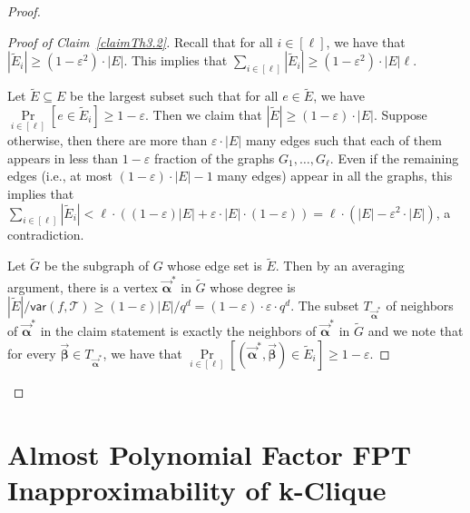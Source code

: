 \documentclass[11pt]{article}
\renewcommand{\ge}{ \geqslant}
\newcommand{\alphab}{\vec{\bm{\alpha}}}
\newcommand{\betab}{\vec{\bm{\beta}}}
\newcommand{\var}{\mathsf{var}}
\renewcommand{\tilde}{\widetilde}
\begin{document}
\begin{proof}
	 \begin{proof}[Proof of Claim~\ref{claimTh3.2}] Recall that for all $i\in [\ell]$, we have that 
		$|\tilde E_i|\ge (1-\varepsilon^2)\cdot |E|$. This implies that $\sum_{i\in [\ell]}|\tilde E_i|\ge (1-\varepsilon^2)\cdot |E|\ell$.
		
		Let $\tilde E\subseteq E$ be the largest subset such that for all $e\in \tilde E$, we have $\underset{i\in [\ell]}{\Pr}[e\in \tilde E_i]\ge 1-\varepsilon$.  Then we claim that $|\tilde E|\ge (1-\varepsilon)\cdot |E|$. Suppose otherwise, then there are more than $\varepsilon\cdot |E|$ many edges  such that each of them appears in less than $1-\varepsilon$ fraction of the graphs $G_1,\ldots ,G_{\ell}$. Even if the remaining edges (i.e., at most $(1-\varepsilon)\cdot |E|-1$ many edges) appear in all the graphs, this implies that $\sum_{i\in [\ell]}|\tilde E_i|< \ell\cdot( (1-\varepsilon)|E| + \varepsilon\cdot |E|\cdot (1-\varepsilon)) = \ell\cdot \left(|E| -\varepsilon^{2}\cdot |E|\right)$, a contradiction. 
		
		Let $\tilde G$ be the subgraph of $G$ whose edge set is $\tilde E$. Then by an averaging argument, there is a vertex $\alphab^*$ in $\tilde G$ whose  degree is $|\tilde E|/\var(f,\mathcal{T})\ge (1-\varepsilon)|E|/q^d= (1-\varepsilon)\cdot \varepsilon\cdot q^d$. The subset $T_{\alphab^*}$ of neighbors of $\alphab^*$ in the claim statement is exactly the neighbors of $\alphab^*$ in $\tilde{G}$ and we note that for every $\betab\in T_{\alphab^*}$, we have that  $\underset{i\in [\ell]}{\Pr}[(\alphab^*,\betab)\in \tilde E_i]\ge 1-\varepsilon$. 
	\end{proof}
	
\end{proof}



\section{Almost Polynomial Factor FPT Inapproximability of k-Clique}\label{sec:main}
\end{document}

